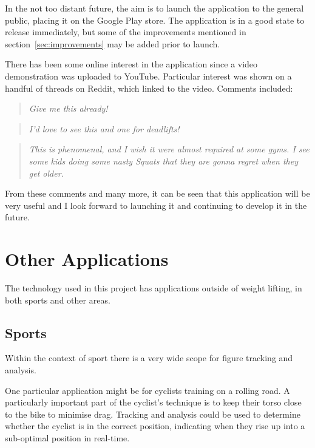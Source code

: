In the not too distant future, the aim is to launch the application to the general public, placing it on the Google Play\cite{googleplay} store. The application is in a good state to release immediately, but some of the improvements mentioned in section~\ref{sec:improvements} may be added prior to launch.

There has been some online interest in the application since a video demonstration was uploaded to YouTube\cite{youtube}. Particular interest was shown on a handful of threads on Reddit\cite{reddit}\cite{redditpopularity}, which linked to the video. Comments included:

\begin{quote}
\emph{Give me this already!}
\end{quote}

\begin{quote}
\emph{I'd love to see this and one for deadlifts!}
\end{quote}

\begin{quote}
\emph{This is phenomenal, and I wish it were almost required at some gyms. I see some kids doing some nasty Squats that they are gonna regret when they get older.}
\end{quote}

From these comments and many more, it can be seen that this application will be very useful and I look forward to launching it and continuing to develop it in the future.

\section{Other Applications}

The technology used in this project has applications outside of weight lifting, in both sports and other areas.

\subsection{Sports}

Within the context of sport there is a very wide scope for figure tracking and analysis.

One particular application might be for cyclists training on a rolling road. A particularly important part of the cyclist's technique is to keep their torso close to the bike to minimise drag. Tracking and analysis could be used to determine whether the cyclist is in the correct position, indicating when they rise up into a sub-optimal position in real-time.

